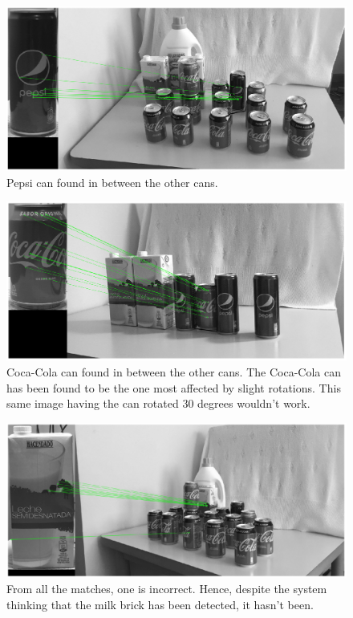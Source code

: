 \documentclass[../main.tex]{subfiles}
\begin{document}
\begin{figure}[H]
    \centering
    \includegraphics[width=1.0\linewidth]{images/sift_hidden_pepsi.png}
    \caption{Pepsi can found in between the other cans.}
    \label{fig:sift_hidden_pepsi}
\end{figure}

\begin{figure}[H]
    \centering
    \includegraphics[width=1.0\linewidth]{images/sift_hidden_cocacola.png}
    \caption{Coca-Cola can found in between the other cans. The Coca-Cola can has been found to be the one most affected by slight rotations. This same image having the can rotated 30 degrees wouldn't work.}
    \label{fig:sift_hidden_cocacola}
\end{figure}

\begin{figure}[H]
    \centering
    \includegraphics[width=1.0\linewidth]{images/sift_hidden_milk.png}
    \caption{From all the matches, one is incorrect. Hence, despite the system thinking that the milk brick has been detected, it hasn't been.}
    \label{fig:sift_hidden_milk}
\end{figure}
\end{document}
